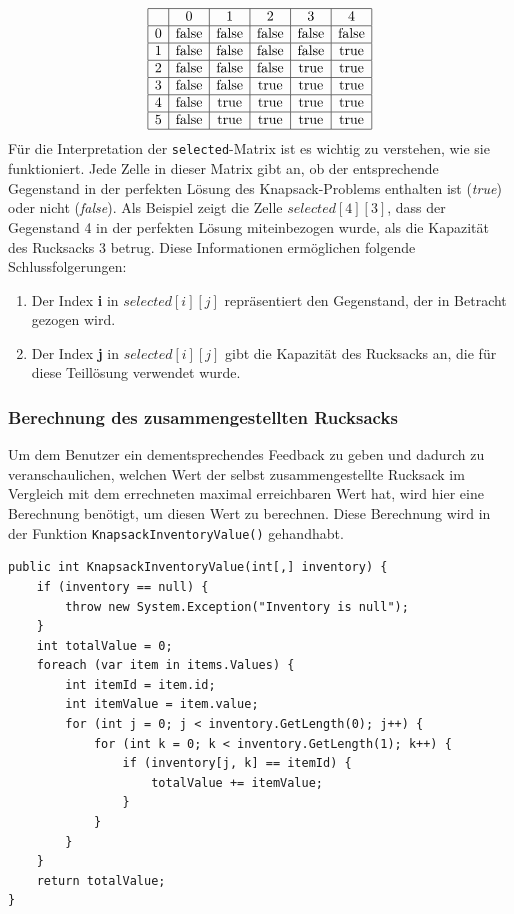 \begin{itemize}
\[
\begin{array}{|c|c|c|c|c|c|}
\hline
& 0 & 1 & 2 & 3 & 4 \\
\hline
0 & \text{false} & \text{false} & \text{false} & \text{false} & \text{false} \\
\hline
1 & \text{false} & \text{false} & \text{false} & \text{false} & \text{true} \\
\hline
2 & \text{false} & \text{false} & \text{false} & \text{true} & \text{true} \\
\hline
3 & \text{false} & \text{false} & \text{true} & \text{true} & \text{true} \\
\hline
4 & \text{false} & \text{true} & \text{true} & \text{true} & \text{true} \\
\hline
5 & \text{false} & \text{true} & \text{true} & \text{true} & \text{true} \\
\hline
\end{array}
\]
Für die Interpretation der \texttt{selected}-Matrix ist es wichtig zu verstehen, wie sie funktioniert. Jede Zelle in dieser
Matrix gibt an, ob der entsprechende Gegenstand in der perfekten Lösung des Knapsack-Problems enthalten ist (\textit{true})
oder nicht (\textit{false}). Als Beispiel zeigt die Zelle $selected[4][3]$, dass der Gegenstand 4 in der perfekten Lösung
miteinbezogen wurde, als die Kapazität des Rucksacks 3 betrug. Diese Informationen ermöglichen folgende Schlussfolgerungen:
\begin{enumerate}
\item Der Index \textbf{i} in $selected[i][j]$ repräsentiert den Gegenstand, der in Betracht gezogen wird.
\item Der Index \textbf{j} in $selected[i][j]$ gibt die Kapazität des Rucksacks an, die für diese Teillösung verwendet
wurde.
\end{enumerate}

\subsubsection{Berechnung des zusammengestellten Rucksacks}
Um dem Benutzer ein dementsprechendes Feedback zu geben und dadurch zu veranschaulichen, welchen Wert der selbst
zusammengestellte Rucksack im Vergleich mit dem errechneten maximal erreichbaren Wert hat, wird hier eine Berechnung
benötigt, um diesen Wert zu berechnen. Diese Berechnung wird in der Funktion \texttt{KnapsackInventoryValue()} gehandhabt.
\begin{lstlisting}[style=csharp, caption={Funktion um eigenen Rucksack zu brechnen}]
public int KnapsackInventoryValue(int[,] inventory) {
    if (inventory == null) {
        throw new System.Exception("Inventory is null");
    }
    int totalValue = 0;
    foreach (var item in items.Values) {
        int itemId = item.id;
        int itemValue = item.value;
        for (int j = 0; j < inventory.GetLength(0); j++) {
            for (int k = 0; k < inventory.GetLength(1); k++) {
                if (inventory[j, k] == itemId) {
                    totalValue += itemValue;
                }
            }
        }
    }
    return totalValue;
}
\end{lstlisting}


\end{itemize}
